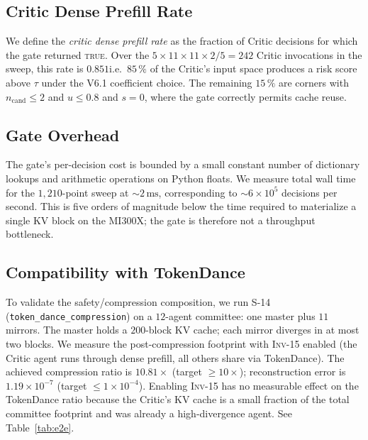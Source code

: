 \documentclass[10pt,twocolumn]{article}
\newcommand{\INV}[1]{\textsc{Inv-#1}}
\newcommand{\Cand}{n_{\text{cand}}}
\newcommand{\Reuse}{u}
\newcommand{\Shuf}{s}
\newcommand{\code}[1]{\texttt{\small #1}}
\begin{document}
\subsection{Critic Dense Prefill Rate}
\label{sec:eval:critic}

We define the \emph{critic dense prefill rate} as the fraction of
Critic decisions for which the gate returned \textsc{true}. Over the
$5 \times 11 \times 11 \times 2 / 5 = 242$ Critic invocations in the
sweep, this rate is $0.851$\textemdash i.e.\ $85\,\%$ of the Critic's
input space produces a risk score above $\tau$ under the V6.1
coefficient choice. The remaining $15\,\%$ are corners with
$\Cand \leq 2$ and $\Reuse \leq 0.8$ and $\Shuf = 0$, where the gate
correctly permits cache reuse.

\subsection{Gate Overhead}
\label{sec:eval:overhead}

The gate's per-decision cost is bounded by a small constant number of
dictionary lookups and arithmetic operations on Python floats. We
measure total wall time for the $1{,}210$-point sweep at $\sim\!2\,\mathrm{ms}$,
corresponding to $\sim\!6 \times 10^{5}$ decisions per second. This is
five orders of magnitude below the time required to materialize a
single KV block on the MI300X; the gate is therefore not a throughput
bottleneck.

\subsection{Compatibility with TokenDance}
\label{sec:eval:tokendance}

To validate the safety/compression composition, we run S-14
(\code{token\_dance\_compression}) on a $12$-agent committee: one master
plus $11$ mirrors. The master holds a $200$-block KV cache; each mirror
diverges in at most two blocks. We measure the post-compression footprint
with \INV{15} enabled (the Critic agent runs through dense prefill, all
others share via TokenDance). The achieved compression ratio is
$\mathbf{10.81\times}$ (target $\geq 10\times$); reconstruction error is
$1.19 \times 10^{-7}$ (target $\leq 1 \times 10^{-4}$). Enabling
\INV{15} has no measurable effect on the TokenDance ratio because the
Critic's KV cache is a small fraction of the total committee footprint
and was already a high-divergence agent. See Table~\ref{tab:e2e}.
\end{document}
